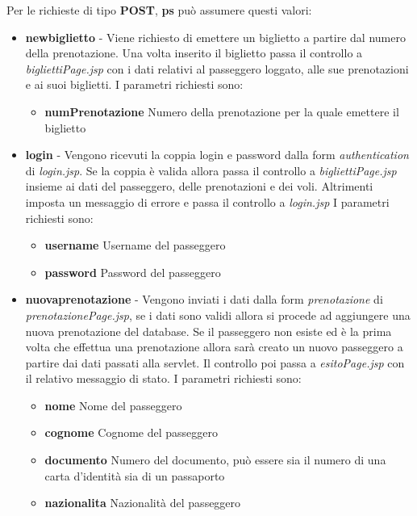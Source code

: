 \documentclass[a4paper,10pt]{article}
\begin{document}
 Per le richieste di tipo \textbf{POST}, \textbf{ps} pu\`o assumere questi valori:
 
 \begin{itemize}
 \item \textbf{newbiglietto} - Viene richiesto di emettere un biglietto a partire dal numero della prenotazione. Una volta inserito il biglietto passa il controllo a \textit{bigliettiPage.jsp} con
				i dati relativi al passeggero loggato, alle sue prenotazioni e ai suoi biglietti.
 				  I parametri richiesti sono:
				   \begin{itemize}
				    \item \textbf{numPrenotazione} Numero della prenotazione per la quale emettere il biglietto
				   \end{itemize}
 \item \textbf{login} - Vengono ricevuti la coppia login e password dalla form \textit{authentication} di \textit{login.jsp}. Se la coppia \`e valida allora passa il controllo
			 a \textit{bigliettiPage.jsp} insieme ai dati del passeggero, delle prenotazioni e dei voli. Altrimenti imposta un messaggio di errore e passa il controllo
			 a \textit{login.jsp}
			 I parametri richiesti sono:
			 \begin{itemize}
			  \item \textbf{username} Username del passeggero
			  \item \textbf{password} Password del passeggero
			 \end{itemize}
 \item \textbf{nuovaprenotazione} - Vengono inviati i dati dalla form \textit{prenotazione} di \textit{prenotazionePage.jsp}, se i dati sono validi allora si procede 
				     ad aggiungere una nuova prenotazione del database. Se il passeggero non esiste ed \`e la prima volta che effettua una prenotazione
				     allora sar\`a creato un nuovo passeggero a partire dai dati passati alla servlet. Il controllo poi passa a \textit{esitoPage.jsp} con 
				     il relativo messaggio di stato.
				     I parametri richiesti sono:
				     \begin{itemize}
				      \item \textbf{nome} Nome del passeggero
				      \item \textbf{cognome} Cognome del passeggero
				      \item \textbf{documento} Numero del documento, pu\`o essere sia il numero di una carta d'identit\`a sia di un passaporto
				      \item \textbf{nazionalita} Nazionalit\`a del passeggero

\end{itemize}
\end{itemize}
\end{document}
